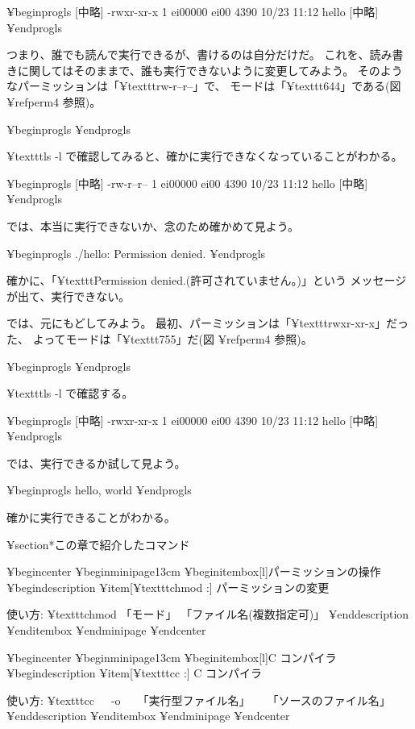 ¥begin{progls}
 [中略]
-rwxr-xr-x  1 ei00000  ei00  4390  10/23 11:12  hello
 [中略]
%
¥end{progls}

つまり、誰でも読んで実行できるが、書けるのは自分だけだ。
これを、読み書きに関してはそのままで、誰も実行できないように変更してみよう。
そのようなパーミッションは「¥texttt{rw-r--r--}」で、
モードは「¥texttt{644}」である(図 ¥ref{perm4} 参照)。

¥begin{progls}
%
¥end{progls}

¥texttt{ls -l} で確認してみると、確かに実行できなくなっていることがわかる。

¥begin{progls}
 [中略]
-rw-r--r--  1 ei00000  ei00  4390  10/23 11:12  hello
 [中略]
%
¥end{progls}

では、本当に実行できないか、念のため確かめて見よう。

¥begin{progls}
./hello: Permission denied.
%
¥end{progls}

確かに、「¥texttt{Permission denied.}(許可されていません。)」という
メッセージが出て、実行できない。

では、元にもどしてみよう。
最初、パーミッションは「¥texttt{rwxr-xr-x}」だった、
よってモードは「¥texttt{755}」だ(図 ¥ref{perm4} 参照)。

¥begin{progls}
%
¥end{progls}

 ¥texttt{ls -l} で確認する。

¥begin{progls}
 [中略]
-rwxr-xr-x  1 ei00000  ei00  4390  10/23 11:12  hello
 [中略]
¥end{progls}

では、実行できるか試して見よう。

¥begin{progls}
hello, world
%
¥end{progls}

確かに実行できることがわかる。

¥section*{この章で紹介したコマンド}

¥begin{center}
¥begin{minipage}{13cm}
¥begin{itembox}[l]{パーミッションの操作}
¥begin{description}
¥item[¥texttt{chmod} :] パーミッションの変更

使い方: ¥texttt{chmod} 「モード」 「ファイル名(複数指定可)」
¥end{description}
¥end{itembox}
¥end{minipage}
¥end{center}

¥begin{center}
¥begin{minipage}{13cm}
¥begin{itembox}[l]{C コンパイラ}
¥begin{description}
¥item[¥texttt{cc} :] C コンパイラ

使い方: ¥texttt{cc}~~~-o~~~「実行型ファイル名」~~~「ソースのファイル名」
¥end{description}
¥end{itembox}
¥end{minipage}
¥end{center}


